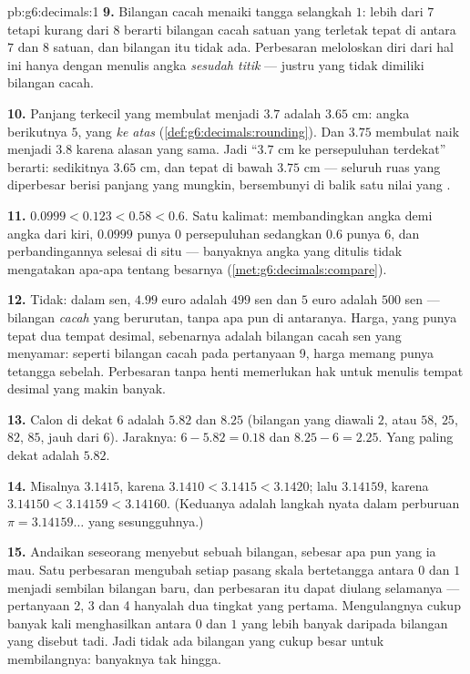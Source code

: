 \begin{solution}{pb:g6:decimals:1}
\textbf{9.} Bilangan cacah menaiki tangga selangkah $1$: lebih dari
$7$ tetapi kurang dari $8$ berarti bilangan cacah satuan yang
terletak tepat di antara $7$ dan $8$ satuan, dan bilangan itu tidak
ada. Perbesaran meloloskan diri dari hal ini hanya dengan menulis
angka \emph{sesudah titik} --- justru yang tidak dimiliki bilangan cacah.

\textbf{10.} Panjang terkecil yang membulat menjadi $3.7$ adalah
$3.65$ cm: angka berikutnya $5$, yang  \emph{ke atas}
(\cref{def:g6:decimals:rounding}). Dan $3.75$ membulat naik menjadi
$3.8$ karena alasan yang sama. Jadi ``$3.7$ cm ke persepuluhan
terdekat'' berarti: sedikitnya $3.65$ cm, dan tepat di bawah $3.75$
cm --- seluruh ruas yang diperbesar berisi panjang yang mungkin,
bersembunyi di balik satu nilai yang .

\textbf{11.} $0.0999 < 0.123 < 0.58 < 0.6$. Satu kalimat:
membandingkan angka demi angka dari kiri, $0.0999$ punya $0$
persepuluhan sedangkan $0.6$ punya $6$, dan perbandingannya selesai
di situ --- banyaknya angka yang ditulis tidak mengatakan apa-apa
tentang besarnya (\cref{met:g6:decimals:compare}).

\textbf{12.} Tidak: dalam sen, $4.99$ euro adalah $499$ sen dan $5$
euro adalah $500$ sen --- bilangan \emph{cacah} yang berurutan, tanpa
apa pun di antaranya. Harga, yang punya tepat dua tempat desimal,
sebenarnya adalah bilangan cacah sen yang menyamar: seperti bilangan
cacah pada pertanyaan 9, harga memang punya tetangga sebelah.
Perbesaran tanpa henti memerlukan hak untuk menulis tempat desimal
yang makin banyak.

\textbf{13.} Calon di dekat $6$ adalah $5.82$ dan $8.25$ (bilangan
yang diawali $2$, atau $58$, $25$, $82$, $85$, jauh dari $6$).
Jaraknya: $6 - 5.82 = 0.18$ dan $8.25 - 6 = 2.25$. Yang paling dekat adalah $5.82$.

\textbf{14.} Misalnya $3.1415$, karena
$3.1410 < 3.1415 < 3.1420$; lalu $3.14159$, karena
$3.14150 < 3.14159 < 3.14160$. (Keduanya adalah langkah nyata dalam
perburuan $\pi = 3.14159\dots$ yang sesungguhnya.)

\textbf{15.} Andaikan seseorang menyebut sebuah bilangan, sebesar apa
pun yang ia mau. Satu perbesaran mengubah setiap pasang skala
bertetangga antara $0$ dan $1$ menjadi sembilan bilangan baru, dan
perbesaran itu dapat diulang selamanya --- pertanyaan 2, 3 dan 4
hanyalah dua tingkat yang pertama. Mengulangnya cukup banyak kali
menghasilkan  antara $0$ dan $1$ yang lebih banyak
daripada bilangan yang disebut tadi. Jadi tidak ada bilangan yang
cukup besar untuk membilangnya: banyaknya tak hingga.

\end{solution}

